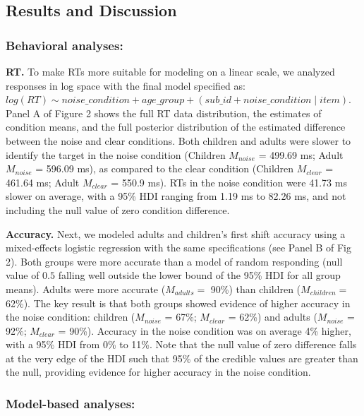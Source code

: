\documentclass[10pt, letterpaper]{article}
\begin{document}
\subsection{Results and Discussion}\label{results-and-discussion}

\subsubsection{Behavioral analyses:}\label{behavioral-analyses}

\textbf{RT.} To make RTs more suitable for modeling on a linear scale,
we analyzed responses in log space with the final model specified as:
\texttt{$log(RT) \sim noise\_condition + age\_group + (sub\_id + noise\_condition \mid item)$}.
Panel A of Figure 2 shows the full RT data distribution, the estimates
of condition means, and the full posterior distribution of the estimated
difference between the noise and clear conditions. Both children and
adults were slower to identify the target in the noise condition
(Children \(M_{noise}\) = 499.69 ms; Adult \(M_{noise}\) = 596.09 ms),
as compared to the clear condition (Children \(M_{clear}\) = 461.64 ms;
Adult \(M_{clear}\) = 550.9 ms). RTs in the noise condition were 41.73
ms slower on average, with a 95\% HDI ranging from 1.19 ms to 82.26 ms,
and not including the null value of zero condition difference.

\textbf{Accuracy.} Next, we modeled adults and children's first shift
accuracy using a mixed-effects logistic regression with the same
specifications (see Panel B of Fig 2). Both groups were more accurate
than a model of random responding (null value of \(0.5\) falling well
outside the lower bound of the 95\% HDI for all group means). Adults
were more accurate (\(M_{adults} =\) 90\%) than children
(\(M_{children} =\) 62\%). The key result is that both groups showed
evidence of higher accuracy in the noise condition: children
(\(M_{noise}\) = 67\%; \(M_{clear}\) = 62\%) and adults (\(M_{noise}\) =
92\%; \(M_{clear}\) = 90\%). Accuracy in the noise condition was on
average 4\% higher, with a 95\% HDI from 0\% to 11\%. Note that the null
value of zero difference falls at the very edge of the HDI such that
95\% of the credible values are greater than the null, providing
evidence for higher accuracy in the noise condition.

\subsubsection{Model-based analyses:}\label{model-based-analyses}
\end{document}
